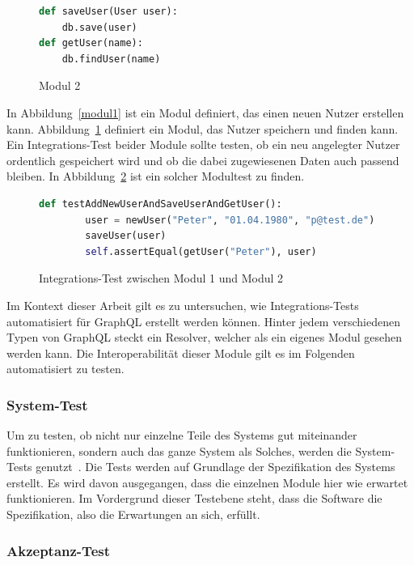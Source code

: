 \begin{figure}[h!]
    \begin{lstlisting}[language=Python]
def saveUser(User user):
    db.save(user)
def getUser(name):
    db.findUser(name)
    \end{lstlisting}
    \caption{Modul 2}
    \label{modul2}
\end{figure}

In Abbildung~\ref{modul1} ist ein Modul definiert, das einen neuen Nutzer erstellen kann.
Abbildung~\ref{modul2} definiert ein Modul, das Nutzer speichern und finden kann.
Ein Integrations-Test beider Module sollte testen, ob ein neu angelegter Nutzer ordentlich gespeichert wird und ob die dabei zugewiesenen Daten auch passend bleiben.
In Abbildung~\ref{integtest} ist ein solcher Modultest zu finden.

\begin{figure}[h!]
    \begin{lstlisting}[language=Python]
def testAddNewUserAndSaveUserAndGetUser():
        user = newUser("Peter", "01.04.1980", "p@test.de")
        saveUser(user)
        self.assertEqual(getUser("Peter"), user)
    \end{lstlisting}
    \caption{Integrations-Test zwischen Modul 1 und Modul 2}
    \label{integtest}
\end{figure}

Im Kontext dieser Arbeit gilt es zu untersuchen, wie Integrations-Tests automatisiert für GraphQL erstellt werden können.
Hinter jedem verschiedenen Typen von GraphQL steckt ein Resolver, welcher als ein eigenes Modul gesehen werden kann.
Die Interoperabilität dieser Module gilt es im Folgenden automatisiert zu testen.

\subsubsection{System-Test}

Um zu testen, ob nicht nur einzelne Teile des Systems gut miteinander funktionieren, sondern auch das ganze System als
Solches, werden die System-Tests genutzt~\cite[vgl. S. 6]{software-testing}.
Die Tests werden auf Grundlage der Spezifikation des Systems erstellt.
Es wird davon ausgegangen, dass die einzelnen Module hier wie erwartet funktionieren.
Im Vordergrund dieser Testebene steht, dass die Software die Spezifikation, also die Erwartungen an sich, erfüllt.

\subsubsection{Akzeptanz-Test}

